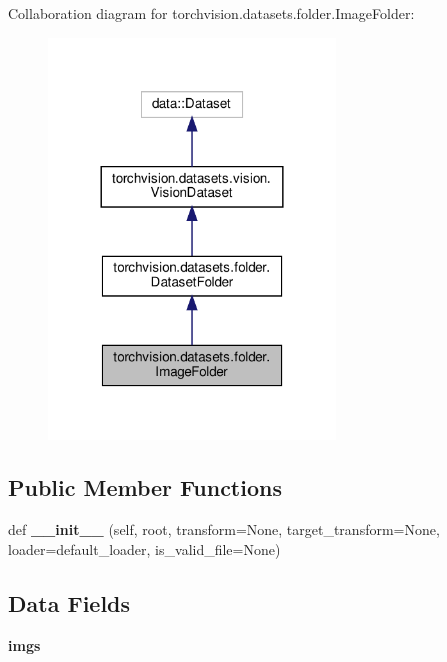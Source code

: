 Collaboration diagram for torchvision.\+datasets.\+folder.\+Image\+Folder\+:
\nopagebreak
\begin{figure}[H]
\begin{center}
\leavevmode
\includegraphics[width=216pt]{classtorchvision_1_1datasets_1_1folder_1_1ImageFolder__coll__graph}
\end{center}
\end{figure}
\subsection*{Public Member Functions}
\begin{DoxyCompactItemize}
\item 
\mbox{\label{classtorchvision_1_1datasets_1_1folder_1_1ImageFolder_a35ca87ce1d724ac63239b443ad7b56aa}} 
def {\bfseries \+\_\+\+\_\+init\+\_\+\+\_\+} (self, root, transform=None, target\+\_\+transform=None, loader=default\+\_\+loader, is\+\_\+valid\+\_\+file=None)
\end{DoxyCompactItemize}
\subsection*{Data Fields}
\begin{DoxyCompactItemize}
\item 
\mbox{\label{classtorchvision_1_1datasets_1_1folder_1_1ImageFolder_abe87ffce873cdee5b27c721ecb3ffe62}} 
{\bfseries imgs}
\end{DoxyCompactItemize}


